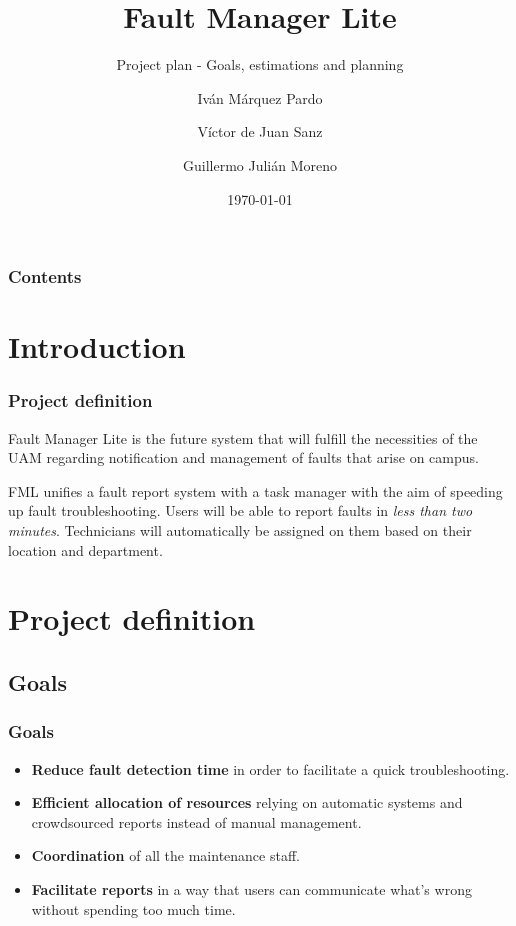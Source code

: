 \documentclass[10pt, compress,usetitleprogressbar,aspectratio=1610]{beamer}
\title{Fault Manager Lite}
\subtitle{Project plan - Goals, estimations and planning}
\date{\today}
\author{Iván Márquez Pardo \and Víctor de Juan Sanz \and Guillermo Julián Moreno}
\institute{Triforce}
\begin{document}
\maketitle

\begin{frame}
\frametitle{Contents}
\tableofcontents[subsectionstyle=show/shaded/hide]
\end{frame}

\section{Introduction}
\begin{frame}[fragile]
\frametitle{Project definition}

Fault Manager Lite is the future system that will fulfill the necessities of the UAM regarding notification and management of faults that arise on campus.

FML unifies a fault report system with a task manager with the aim of speeding up fault troubleshooting. Users will be able to report faults in \emph{less than two minutes}. Technicians will automatically be assigned on them based on their location and department.
\end{frame}

\section{Project definition}

\subsection{Goals}
\begin{frame}
\frametitle{Goals}

\begin{itemize}
\item \textbf{Reduce fault detection time} in order to facilitate a quick troubleshooting.
\item \textbf{Efficient allocation of resources} relying on automatic systems and crowdsourced reports instead of manual management.
\item \textbf{Coordination} of all the maintenance staff.
\item \textbf{Facilitate reports} in a way that users can communicate what's wrong without spending too much time.
\end{itemize}
\end{frame}
\end{document}
